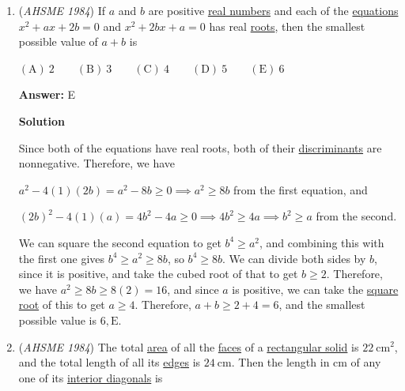 \begin{enumerate}
 


	\item (\textit{AHSME 1984}) If $a$ and $b$ are positive \href{https://artofproblemsolving.com/wiki/index.php?title=Real\_numbers}{real numbers} and each of the \href{https://artofproblemsolving.com/wiki/index.php?title=Equation}{equations} $x^2+ax+2b=0$ and $x^2+2bx+a=0$ has real \href{https://artofproblemsolving.com/wiki/index.php?title=Root\_(polynomial)}{roots}, then the smallest possible value of $a+b$ is


 $\mathrm{(A) \ }2 \qquad \mathrm{(B) \ }3 \qquad \mathrm{(C) \ } 4 \qquad \mathrm{(D) \ }5 \qquad \mathrm{(E) \ } 6$

 \textbf{Answer: }E



\textbf{Solution}

Since both of the equations have real roots, both of their \href{https://artofproblemsolving.com/wiki/index.php?title=Discriminant}{discriminants} are nonnegative. Therefore, we have 

 $a^2-4(1)(2b)=a^2-8b\geq0\implies a^2\geq8b$ from the first equation, and 

 $(2b)^2-4(1)(a)=4b^2-4a\geq0\implies 4b^2\geq4a\implies b^2\geq a$ from the second.

 We can square the second equation to get $b^4\geq a^2$, and combining this with the first one gives $b^4\geq a^2\geq8b$, so $b^4\geq8b$. We can divide both sides by $b$, since it is positive, and take the cubed root of that to get $b\geq2$. Therefore, we have $a^2\geq8b\geq8(2)=16$, and since $a$ is positive, we can take the \href{https://artofproblemsolving.com/wiki/index.php?title=Square\_root}{square root} of this to get $a\geq4$. Therefore, $a+b\geq 2+4=6$, and the smallest possible value is $6, \boxed{\text{E}}$. 

 


	\item (\textit{AHSME 1984}) The total \href{https://artofproblemsolving.com/wiki/index.php?title=Area}{area} of all the \href{https://artofproblemsolving.com/wiki/index.php?title=Faces}{faces} of a \href{https://artofproblemsolving.com/wiki/index.php?title=Rectangular\_prism}{rectangular solid} is $22 \ \text{cm}^2$, and the total length of all its \href{https://artofproblemsolving.com/wiki/index.php?title=Edges}{edges} is $24 \ \text{cm}$. Then the length in cm of any one of its \href{https://artofproblemsolving.com/wiki/index.php?title=Diagonal\#Polyhedra}{interior diagonals} is



\end{enumerate}
